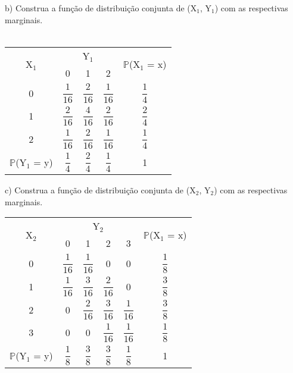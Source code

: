 \documentclass[12pt,a4paper,draft]{article}
\begin{document}
	\vspace{1cm}
	b) Construa a função de distribuição conjunta de (X$_{1}$, Y$_{1}$) com as respectivas marginais.\\
	\vspace{1cm}\\
	\begin{center}
		\begin{tabular}{ccccc}\midrule
			\multirow{2}{*}{X$_{1}$} & \multicolumn{3}{c}{Y$_{1}$} & \multirow{2}{*}{$\mathbb{P}$(X$_{1}$ = x)}\\ \cmidrule{2-4}
			& 0 & 1 & 2 & \\ \midrule
			0 & $\dfrac{1}{16}$ & $\dfrac{2}{16}$ & $\dfrac{1}{16}$ & $\dfrac{1}{4}$\\ \midrule
			1 & $\dfrac{2}{16}$ & $\dfrac{4}{16}$ & $\dfrac{2}{16}$ & $\dfrac{2}{4}$\\ \midrule
			2 & $\dfrac{1}{16}$ & $\dfrac{2}{16}$ & $\dfrac{1}{16}$ & $\dfrac{1}{4}$\\ \midrule
			$\mathbb{P}$(Y$_{1}$ = y) & $\dfrac{1}{4}$ & $\dfrac{2}{4}$ & $\dfrac{1}{4}$ & 1\\ \midrule
		\end{tabular}
	\end{center}
	\vspace{1cm}
	c) Construa a função de distribuição conjunta de (X$_{2}$, Y$_{2}$) com as respectivas marginais.
	\vspace{1cm}\\
	\begin{center}
		\begin{tabular}{cccccc}\midrule
			\multirow{2}{*}{X$_{2}$} & \multicolumn{4}{c}{Y$_{2}$} & \multirow{2}{*}{$\mathbb{P}$(X$_{1}$ = x)}\\ \cmidrule{2-5}
			& 0 & 1 & 2 & 3 & \\ \midrule
			0 & $\dfrac{1}{16}$ & $\dfrac{1}{16}$ & 0 & 0 & $\dfrac{1}{8}$\\ \midrule
			1 & $\dfrac{1}{16}$ & $\dfrac{3}{16}$ & $\dfrac{2}{16}$ & 0 & $\dfrac{3}{8}$\\ \midrule
			2 & 0 & $\dfrac{2}{16}$ & $\dfrac{3}{16}$ & $\dfrac{1}{16}$ & $\dfrac{3}{8}$\\ \midrule
			3 & 0 & 0 & $\dfrac{1}{16}$ & $\dfrac{1}{16}$ & $\dfrac{1}{8}$\\ \midrule
			$\mathbb{P}$(Y$_{1}$ = y) & $\dfrac{1}{8}$ & $\dfrac{3}{8}$ & $\dfrac{3}{8}$ & $\dfrac{1}{8}$ & 1\\ \midrule
		\end{tabular}
	\end{center}
\end{document}
